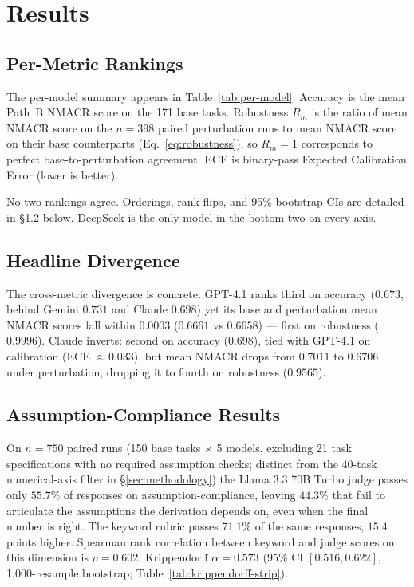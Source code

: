 
\section{Results}
\label{sec:results}

\subsection{Per-Metric Rankings}

The per-model summary appears in Table~\ref{tab:per-model}. Accuracy
is the mean Path~B NMACR score on the 171 base tasks. Robustness
$R_m$ is the ratio of mean NMACR score on the $n=398$ paired
perturbation runs to mean NMACR score on their base counterparts
(Eq.~\ref{eq:robustness}), so $R_m = 1$ corresponds to perfect
base-to-perturbation agreement. ECE is binary-pass Expected
Calibration Error (lower is better).

No two rankings agree. Orderings, rank-flips, and 95\% bootstrap
CIs are detailed in \S\ref{sec:headline-divergence} below. DeepSeek
is the only model in the bottom two on every axis.

\subsection{Headline Divergence}
\label{sec:headline-divergence}

The cross-metric divergence is concrete: GPT-4.1 ranks third on
accuracy ($0.673$, behind Gemini $0.731$ and Claude $0.698$) yet
its base and perturbation mean NMACR scores fall within $0.0003$
($0.6661$ vs $0.6658$) --- first on robustness ($0.9996$). Claude
inverts: second on accuracy ($0.698$), tied with GPT-4.1 on
calibration (ECE $\approx 0.033$), but mean NMACR drops from
$0.7011$ to $0.6706$ under perturbation, dropping it to fourth on
robustness ($0.9565$).

\subsection{Assumption-Compliance Results}
\label{sec:assumption-compliance}

On $n=750$ paired runs (150 base tasks $\times$ 5 models, excluding
21 task specifications with no required assumption checks; distinct
from the 40-task numerical-axis filter in \S\ref{sec:methodology})
the Llama 3.3 70B Turbo judge passes only $55.7\%$ of responses on
assumption-compliance, leaving $44.3\%$
that fail to articulate the assumptions the derivation depends on,
even when the final number is right. The keyword rubric passes
$71.1\%$ of the same responses, $15.4$ points higher. Spearman
rank correlation between keyword and judge scores on this dimension
is $\rho = 0.602$; Krippendorff $\alpha = 0.573$ (95\% CI
$[0.516, 0.622]$, 1{,}000-resample bootstrap;
Table~\ref{tab:krippendorff-strip}).

